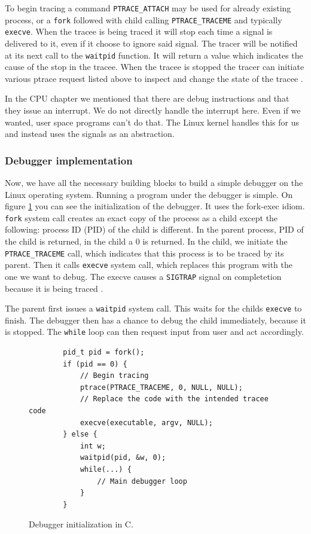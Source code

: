 To begin tracing a command \texttt{PTRACE\_ATTACH} may be used for already
existing process, or a \texttt{fork} followed with child calling
\texttt{PTRACE\_TRACEME} and typically \texttt{execve}. When the tracee is
being traced it will stop each time a signal is delivered to it, even if it
choose to ignore said signal. The tracer will be notified at its next call to
the \texttt{waitpid} function. It will return a value which indicates the cause
of the stop in the tracee. When the tracee is stopped the tracer can initiate
various ptrace request listed above to inspect and change the state of the
tracee \cite{ptrace}.

In the CPU chapter we mentioned that there are debug instructions and that they
issue an interrupt. We do not directly handle the interrupt here. Even if we
wanted, user space programs can't do that. The Linux kernel handles this for us
and instead uses the signals as an abstraction. 

\subsubsection{Debugger implementation}
Now, we have all the necessary building blocks to build a simple debugger on
the Linux operating system. Running a program under the debugger is simple. On
figure \ref{fig:debugger-init} you can see the initialization of the debugger.
It uses the fork-exec idiom. \texttt{fork} system call creates an exact copy of
the process as a child except the following: process ID (PID) of the child is
different. In the parent process, PID of the child is returned, in the child a
$0$ is returned. In the child, we initiate the \texttt{PTRACE\_TRACEME} call,
which indicates that this process is to be traced by its parent. Then it calls
\texttt{execve} system call, which replaces this program with the one we want
to debug. The execve causes a \texttt{SIGTRAP} signal on completetion because
it is being traced \cite{execve}.

The parent first issues a \texttt{waitpid} system call. This waits for the
childs \texttt{execve} to finish. The debugger then has a chance to debug the
child immediately, because it is stopped. The \texttt{while} loop can then
request input from user and act accordingly.

\begin{figure}\label{fig:debugger-init}
    \begin{verbatim}
        pid_t pid = fork();
        if (pid == 0) {
            // Begin tracing
            ptrace(PTRACE_TRACEME, 0, NULL, NULL);
            // Replace the code with the intended tracee code
            execve(executable, argv, NULL);
        } else {
            int w;
            waitpid(pid, &w, 0);
            while(...) {
                // Main debugger loop
            }
        }
    \end{verbatim}
    \caption{Debugger initialization in C.}
\end{figure}

